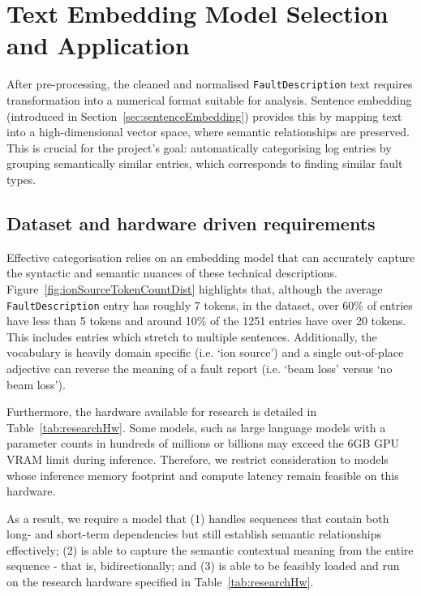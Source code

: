 \documentclass[10pt,oneside]{report}
\begin{document}
\section{Text Embedding Model Selection and Application}
After pre-processing, the cleaned and normalised \texttt{FaultDescription} text requires transformation into a numerical format suitable for analysis. Sentence embedding (introduced in Section~\ref{sec:sentenceEmbedding}) provides this by mapping text into a high-dimensional vector space, where semantic relationships are preserved. This is crucial for the project's goal: automatically categorising log entries by grouping semantically similar entries, which corresponds to finding similar fault types. 

\subsection{Dataset and hardware driven requirements}\label{sec:req}
Effective categorisation relies on an embedding model that can accurately capture the syntactic and semantic nuances of these technical descriptions. Figure~\ref{fig:ionSourceTokenCountDist} highlights that, although the average \texttt{FaultDescription} entry has roughly 7 tokens, in the dataset, over 60\% of entries have less than 5 tokens and around 10\% of the 1251 entries have over 20 tokens. This includes entries which stretch to multiple sentences. Additionally, the vocabulary is heavily domain specific (i.e. `ion source') and a single out-of-place adjective can reverse the meaning of a fault report (i.e. `beam loss' versus `no beam loss').  

Furthermore, the hardware available for research is detailed in Table~\ref{tab:researchHw}. Some models, such as large language models with a parameter counts in hundreds of millions or billions may exceed the 6GB GPU VRAM limit during inference. Therefore, we restrict consideration to models whose inference memory footprint and compute latency remain feasible on this hardware.

As a result, we require a model that (1) handles sequences that contain both long- and short-term dependencies but still establish semantic relationships effectively; (2) is able to capture the semantic contextual meaning from the entire sequence - that is, bidirectionally; and (3) is able to be feasibly loaded and run on the research hardware specified in Table~\ref{tab:researchHw}.
\end{document}

